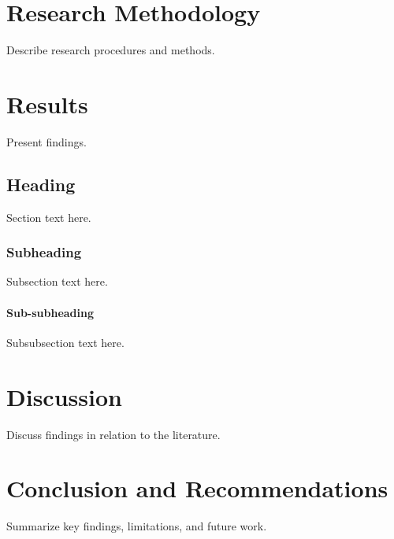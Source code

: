 \documentclass{muthesis2026}
\begin{document}
\chapter{Research Methodology}
Describe research procedures and methods.

\chapter{Results}
Present findings.

\section{Heading}
Section text here.

\subsection{Subheading}
Subsection text here.

\subsubsection{Sub-subheading}
Subsubsection text here.

\chapter{Discussion}
Discuss findings in relation to the literature.

\chapter{Conclusion and Recommendations}
Summarize key findings, limitations, and future work.




\biography
\end{document}
